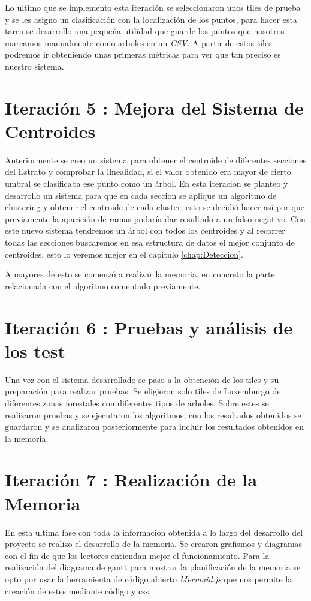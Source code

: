 Lo ultimo que se implemento  esta iteración se seleccionaron unos tiles de prueba y se les asigno un clasificación con la localización de los puntos, para hacer esta tarea se desarrollo una pequeña utilidad que guarde los puntos que nosotros marcamos manualmente como arboles en un \textit{CSV}. A partir de estos tiles podremos ir obteniendo unas primeras métricas para ver que tan preciso es nuestro sistema.

\section{Iteración 5 : Mejora del Sistema de Centroides}
Anteriormente se creo un sistema para obtener el centroide de diferentes secciones del Estrato y comprobar la linealidad, si el valor obtenido era mayor de cierto umbral se clasificaba ese punto como un árbol. En esta iteracion se planteo y desarrollo un sistema para que en cada seccion se aplique un algoritmo de clustering y obtener el centroide de cada cluster, esto se decidió hacer así por que previamente la aparición de ramas podaría dar resultado a un falso negativo. Con este nuevo sistema tendremos un árbol con todos los centroides y al recorrer todas las secciones buscaremos en esa estructura de datos el mejor conjunto de centroides, esto lo veremos mejor en el capitulo \ref{chap:Deteccion}.

A mayores de esto se comenzó a realizar la memoria, en concreto la parte relacionada con el algoritmo comentado previamente.

\section{Iteración 6 : Pruebas y análisis de los test}
Una vez con el sistema desarrollado se paso a la obtención de los tiles y su preparación para realizar pruebas. Se eligieron solo tiles de Luxemburgo de diferentes zonas forestales con diferentes tipos de arboles. Sobre estes se realizaron pruebas y se ejecutaron los algoritmos, con los resultados obtenidos se guardaron y se analizaron posteriormente para incluir los resultados obtenidos en la memoria.

\section{Iteración 7 : Realización de la Memoria}

En esta ultima fase con toda la información obtenida a lo largo del desarrollo del proyecto se realizo el desarrollo de la memoria. Se crearon grafismos y diagramas con el fin de que los lectores entiendan mejor el funcionamiento. Para la realización del diagrama de gantt para mostrar la planificación de la memoria se opto por usar la herramienta de código abierto \textit{Mermaid.js} que nos permite la creación de estes mediante código y css.


